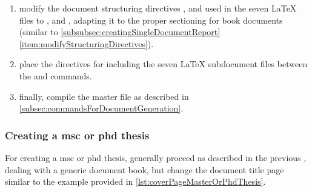\begin{enumerate}
\item modify the document structuring directives \latexcmd{\section},
  \latexcmd{\subsection} and \latexcmd{\subsubsection} used in the seven
  \LaTeX{} files to \latexcmd{\chapter}, \latexcmd{\section} and
  \latexcmd{\subsection}, adapting it to the proper sectioning for book
  documents (similar to \autoref{subsubsec:creatingSingleDocumentReport}
  \autoref{item:modifyStructuringDirectives}).

\item place the \latexcmd{} directives for including the seven
  \LaTeX{} subdocument files between the \latexcmd{\mainmatter} and
  \latexcmd{\appendix} commands.

\item finally, compile the master file  as described in
  \autoref{subsec:commandsForDocumentGeneration}.

\end{enumerate}



\subsubsection[A \singledoc \ac{msc} or \ac{phd} thesis]{Creating a \singledoc \ac{msc} or \ac{phd} thesis}
\label{subsubsec:creatingMasterOrPhdThesis}

For creating a \singledoc \ac{msc} or \ac{phd} thesis, generally proceed as 
described in the previous , 
dealing with a generic \singledoc document book, but change the document title page
similar to the example provided in \autoref{lst:coverPageMasterOrPhdThesis}.  


